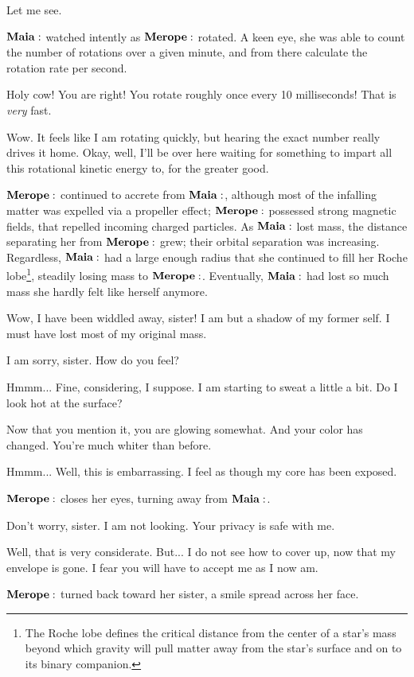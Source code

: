 \documentclass[main.tex]{subfiles}
\begin{document}
\Maia Let me see.

$\Maia$ watched intently as $\Merope$ rotated.  A keen eye, she was able to count the number of rotations over a given minute, and from there calculate the rotation rate per second.

\Maia Holy cow!  You are right! You rotate roughly once every 10 milliseconds!  That is \textit{very} fast.  

\Merope Wow.  It feels like I am rotating quickly, but hearing the exact number really drives it home.  Okay, well, I'll be over here waiting for something to impart all this rotational kinetic energy to, for the greater good. 

$\Merope$ continued to accrete from $\Maia$, although most of the infalling matter was expelled via a propeller effect; $\Merope$ possessed strong magnetic fields, that repelled incoming charged particles.  As $\Maia$ lost mass, the distance separating her from $\Merope$ grew; their orbital separation was increasing.  Regardless, $\Maia$ had a large enough radius that she continued to fill her Roche lobe\footnote{The Roche lobe defines the critical distance from the center of a star's mass beyond which gravity will pull matter away from the star's surface and on to its binary companion.}, steadily losing mass to $\Merope$.  Eventually, $\Maia$ had lost so much mass she hardly felt like herself anymore.

\Maia Wow, I have been widdled away, sister!  I am but a shadow of my former self.  I must have lost most of my original mass.  

\Merope I am sorry, sister.  How do you feel?

\Maia Hmmm... Fine, considering, I suppose.  I am starting to sweat a little a bit.  Do I look hot at the surface?

\Merope Now that you mention it, you are glowing somewhat.  And your color has changed. You're much whiter than before.

\Maia Hmmm...  Well, this is embarrassing.  I feel as though my core has been exposed.    

$\Merope$ closes her eyes, turning away from $\Maia$.

\Merope Don't worry, sister.  I am not looking.  Your privacy is safe with me.

\Maia Well, that is very considerate.  But... I do not see how to cover up, now that my envelope is gone. I fear you will have to accept me as I now am.

$\Merope$ turned back toward her sister, a smile spread across her face.
\end{document}
